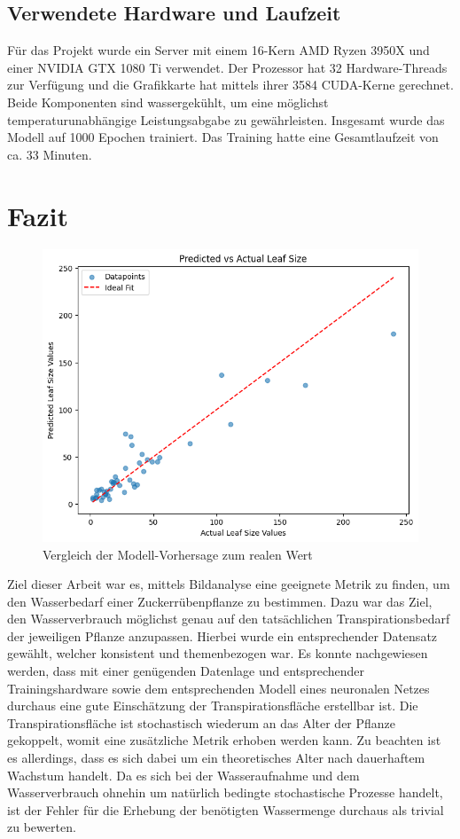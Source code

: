 \subsection{Verwendete Hardware und Laufzeit}
Für das Projekt wurde ein Server mit einem 16-Kern AMD Ryzen 3950X und einer NVIDIA GTX 1080 Ti verwendet. Der Prozessor hat 32 Hardware-Threads zur Verfügung und die Grafikkarte hat mittels ihrer 3584 CUDA-Kerne gerechnet. Beide Komponenten sind wassergekühlt, um eine möglichst temperaturunabhängige Leistungsabgabe zu gewährleisten. Insgesamt wurde das Modell auf 1000 Epochen trainiert. Das Training hatte eine Gesamtlaufzeit von ca. 33 Minuten.
\section{Fazit}
\begin{figure}
    \centering
    \includegraphics[width=0.8\linewidth]{leafsize.png}
    \caption{Vergleich der Modell-Vorhersage zum realen Wert}
    \label{fig:enter-label}
\end{figure}
Ziel dieser Arbeit war es, mittels Bildanalyse eine geeignete Metrik zu finden, um den Wasserbedarf einer Zuckerrübenpflanze zu bestimmen. Dazu war das Ziel, den Wasserverbrauch möglichst genau auf den tatsächlichen Transpirationsbedarf der jeweiligen Pflanze anzupassen. Hierbei wurde ein entsprechender Datensatz gewählt, welcher konsistent und themenbezogen war. Es konnte nachgewiesen werden, dass mit einer genügenden Datenlage und entsprechender Trainingshardware sowie dem entsprechenden Modell eines neuronalen Netzes durchaus eine gute Einschätzung der Transpirationsfläche erstellbar ist. Die Transpirationsfläche ist stochastisch wiederum an das Alter der Pflanze gekoppelt, womit eine zusätzliche Metrik erhoben werden kann. Zu beachten ist es allerdings, dass es sich dabei um ein theoretisches Alter nach dauerhaftem Wachstum handelt. Da es sich bei der Wasseraufnahme und dem Wasserverbrauch ohnehin um natürlich bedingte stochastische Prozesse handelt, ist der Fehler für die Erhebung der benötigten Wassermenge durchaus als trivial zu bewerten.
